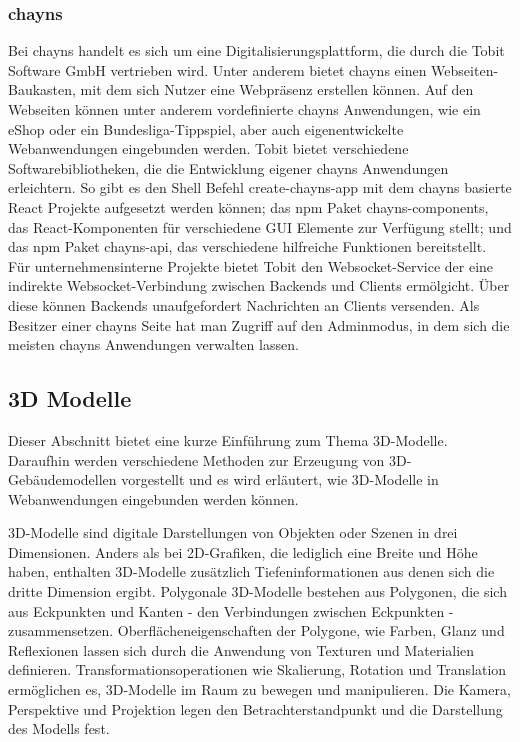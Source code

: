 \subsubsection{chayns}\label{sec:Chayns}
Bei chayns handelt es sich um eine Digitalisierungsplattform, die durch die Tobit Software GmbH vertrieben wird. Unter anderem bietet chayns einen Webseiten-Baukasten, mit dem sich Nutzer eine Webpräsenz erstellen können. Auf den Webseiten können unter anderem vordefinierte chayns Anwendungen, wie ein eShop oder ein Bundesliga-Tippspiel, aber auch eigenentwickelte Webanwendungen eingebunden werden. Tobit bietet verschiedene Softwarebibliotheken, die die Entwicklung eigener chayns Anwendungen erleichtern. So gibt es den Shell Befehl create-chayns-app mit dem chayns basierte React Projekte aufgesetzt werden können; das \ac{npm} Paket chayns-components, das React-Komponenten für verschiedene \ac{GUI} Elemente zur Verfügung stellt; und das \ac{npm} Paket chayns-api, das verschiedene hilfreiche Funktionen bereitstellt. Für unternehmensinterne Projekte bietet Tobit den \gls{Websocket}-Service der eine indirekte \gls{Websocket}-Verbindung zwischen Backends und Clients ermölgicht. Über diese können Backends unaufgefordert Nachrichten an Clients versenden. Als Besitzer einer chayns Seite hat man Zugriff auf den Adminmodus, in dem sich die meisten chayns Anwendungen verwalten lassen.

\subsection{3D Modelle}
Dieser Abschnitt bietet eine kurze Einführung zum Thema 3D-Modelle. Daraufhin werden verschiedene Methoden zur Erzeugung von 3D-Gebäudemodellen vorgestellt und es wird erläutert, wie 3D-Modelle in Webanwendungen eingebunden werden können.

3D-Modelle sind digitale Darstellungen von Objekten oder Szenen in drei Dimensionen. Anders als bei 2D-Grafiken, die lediglich eine Breite und Höhe haben, enthalten 3D-Modelle zusätzlich Tiefeninformationen aus denen sich die dritte Dimension ergibt. Polygonale 3D-Modelle bestehen aus Polygonen, die sich aus Eckpunkten und Kanten - den Verbindungen zwischen Eckpunkten - zusammensetzen. Oberflächeneigenschaften der Polygone, wie Farben, Glanz und Reflexionen lassen sich durch die Anwendung von Texturen und Materialien definieren. Transformationsoperationen wie Skalierung, Rotation und Translation ermöglichen es, 3D-Modelle im Raum zu bewegen und manipulieren. Die Kamera, Perspektive und Projektion legen den Betrachterstandpunkt und die Darstellung des Modells fest.\cite[S.~8-16]{Parisi2014}

